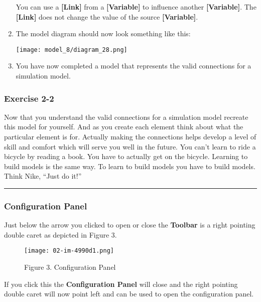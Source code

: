 \documentclass[]{memoir}
\makeatletter
\def\maxwidth{\ifdim\Gin@nat@width>\linewidth\linewidth
\else\Gin@nat@width\fi}
\let\Oldincludegraphics\includegraphics
\renewcommand{\includegraphics}[1]{\Oldincludegraphics[width=\maxwidth]{#1}}
\newcommand{\p}[1]{\textbf{{[}#1{]}}}
\renewcommand{\u}[1]{\textbf{#1}}
\makeatother
\begin{document}
\begin{oframed}
\begin{enumerate}
You can use a \p{Link} from a \p{Variable} to influence another \p{Variable}. The \p{Link} does not change the value of the source \p{Variable}.


\item The model diagram should now look something like this: \par \begin{minipage}{\linewidth}  \centering \texttt{[image: model\_8/diagram\_28.png]}
\end{minipage}
\item 

You have now completed a model that represents the valid connections for a simulation model.



\end{enumerate} \end{oframed}

\subsubsection{Exercise 2-2}

Now that you understand the valid connections for a simulation model
recreate this model for yourself. And as you create each element think
about what the particular element is for. Actually making the
connections helps develop a level of skill and comfort which will serve
you well in the future. You can't learn to ride a bicycle by reading a
book. You have to actually get on the bicycle. Learning to build models
is the same way. To learn to build models you have to build models.
Think Nike, ``Just do it!''

\begin{center}\rule{3in}{0.4pt}\end{center}

\subsubsection{Configuration Panel}

Just below the arrow you clicked to open or close the \u{Toolbar} is a
right pointing double caret as depicted in Figure 3.

\begin{figure}[htbp]
\centering
\texttt{[image: 02-im-4990d1.png]}
\caption{Figure 3. Configuration Panel}
\end{figure}

If you click this the \u{Configuration Panel} will close and the right
pointing double caret will now point left and can be used to open the
configuration panel.
\end{document}
